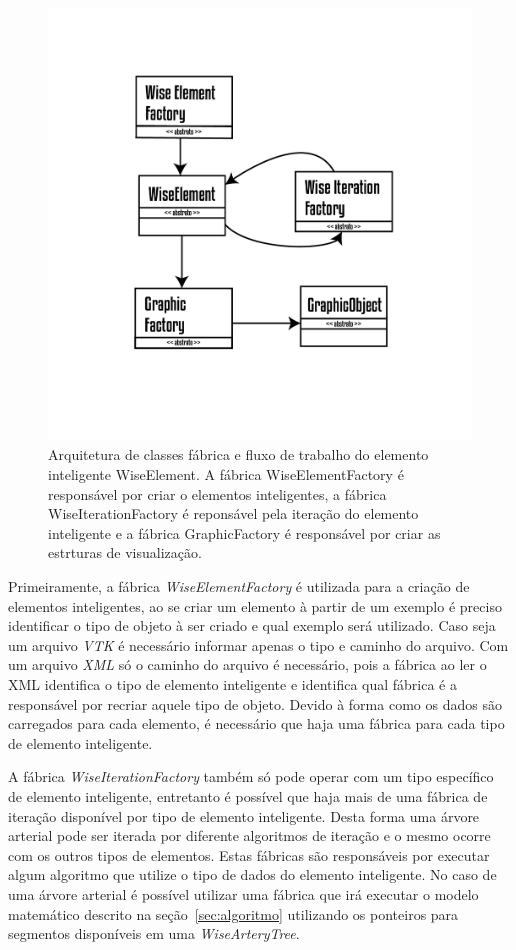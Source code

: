 \documentclass[
        english,			
        brazil			        %
        ,<...>]{abntbibufjf}
\begin{document}
\begin{figure}[!htbp]
	\centering
	\includegraphics[scale=1]{Figures/WiseElementWorkflow.png}
	\caption{Arquitetura de classes fábrica e fluxo de trabalho do elemento inteligente WiseElement. A fábrica WiseElementFactory é responsável por criar o elementos inteligentes, a fábrica WiseIterationFactory é reponsável pela iteração do elemento inteligente e a fábrica GraphicFactory é responsável por criar as estrturas de visualização. }
	\label{fig2:wiselementsworkflow}
\end{figure}
 
Primeiramente, a fábrica \textit{WiseElementFactory}  é utilizada para a criação de elementos inteligentes, ao se criar um elemento à partir de um exemplo é preciso identificar o tipo de objeto à ser criado e qual exemplo será utilizado. Caso seja um arquivo \textit{VTK} é necessário informar apenas o tipo e caminho do arquivo. Com um arquivo \textit{XML} só o caminho do arquivo é necessário, pois a fábrica ao ler o XML identifica o tipo de elemento inteligente e identifica qual fábrica é a responsável por recriar aquele tipo de objeto. Devido à forma como os dados são carregados para cada elemento, é necessário que haja uma fábrica para cada tipo de elemento inteligente.

A fábrica \textit{WiseIterationFactory} também só pode operar com um tipo específico de elemento inteligente, entretanto é possível que haja mais de uma fábrica de iteração disponível por tipo de elemento inteligente. Desta forma uma árvore arterial pode ser iterada por diferente algoritmos de iteração e o mesmo ocorre com os outros tipos de elementos. Estas fábricas são responsáveis por executar algum algoritmo que utilize o tipo de dados do elemento inteligente. No caso de uma árvore arterial é possível utilizar uma fábrica que irá executar o modelo matemático descrito na seção~\ref{sec:algoritmo} utilizando os ponteiros para segmentos disponíveis em uma \textit{WiseArteryTree}.
\end{document}
